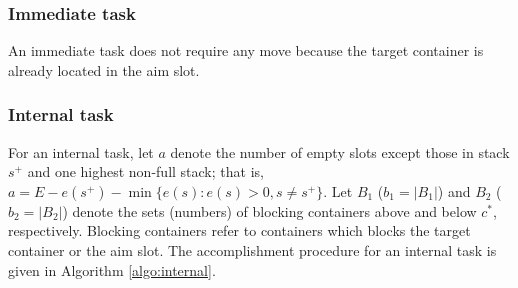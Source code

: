 \documentclass[review,3p,times,12pt,number]{elsarticle}\usepackage{amsmath}\usepackage{amssymb}
\begin{document}
\subsubsection{Immediate task}

An immediate task does not require any move because the target container is already located in the aim slot.

\subsubsection{Internal task}

For an internal task, let $a$ denote the number of empty slots except those in stack $s^+$ and one highest non-full stack; that is, $a=E-e(s^+)-\min\{e(s):e(s)>0,s\neq s^+\}$.   Let $B_1$ ($b_1=|B_1|$) and $B_2$ ($b_2=|B_2|$) denote the sets (numbers) of blocking containers above and below $c^*$, respectively. Blocking containers refer to containers which blocks the target container or the aim slot.
The accomplishment procedure for an internal task is given in Algorithm \ref{algo:internal}.
\end{document}
